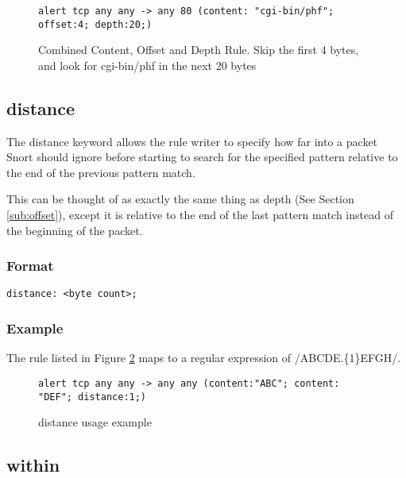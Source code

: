 \documentclass[english]{report}
\begin{document}
\begin{figure}[!hbpt]
\begin{verbatim}
alert tcp any any -> any 80 (content: "cgi-bin/phf"; offset:4; depth:20;)
\end{verbatim}

\caption{\label{combined rule with offset and depth} Combined Content, Offset
and Depth Rule. Skip the first 4 bytes, and look for cgi-bin/phf in the next 20 bytes}
\end{figure}

\subsection{distance\label{sub:Distance}}

The distance keyword allows the rule writer to specify how far into a packet
Snort should ignore before starting to search for the specified pattern
relative to the end of the previous pattern match.  

This can be thought of as exactly the same thing as depth (See Section
\ref{sub:offset}), except it is relative to the end of the last pattern match
instead of the beginning of the packet.

\subsubsection{Format}

\begin{verbatim}
distance: <byte count>;
\end{verbatim}

\subsubsection{Example}

The rule listed in Figure \ref{fig:Distance} maps to a regular
expression of /ABCDE.\{1\}EFGH/.

\begin{figure}[!hbpt]
\begin{verbatim}
alert tcp any any -> any any (content:"ABC"; content: "DEF"; distance:1;)
\end{verbatim}
\caption{distance usage example \label{fig:Distance}}
\end{figure}



\subsection{within\label{sub:Within}}
\end{document}
